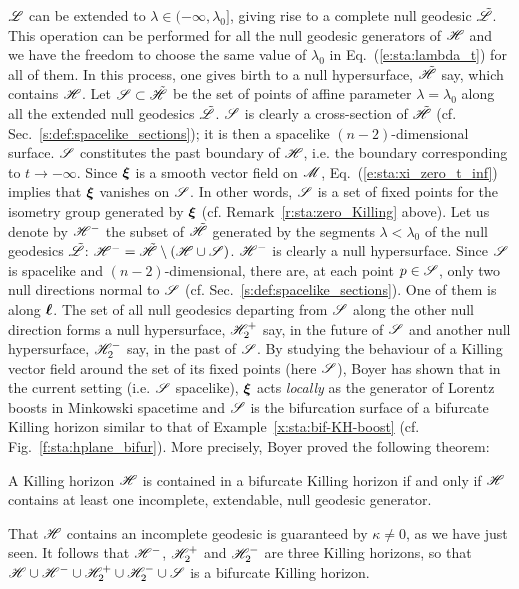 $\mathscr{L}$ can be
extended to $\lambda\in(-\infty,\lambda_0]$, giving rise to a complete
null geodesic $\tilde{\mathscr{L}}$. This operation can be performed for all the
null geodesic generators of $\mathscr{H}$ and we have the freedom to choose the same value
of $\lambda_0$ in Eq.~(\ref{e:sta:lambda_t}) for all of them. In this process,
one gives birth to a null hypersurface, $\tilde{\mathscr{H}}$ say, which contains $\mathscr{H}$. Let $\mathscr{S}\subset\tilde{\mathscr{H}}$ be the set of points of
affine parameter $\lambda=\lambda_0$ along all the extended null geodesics
$\tilde{\mathscr{L}}$. $\mathscr{S}$ is clearly a cross-section of $\tilde{\mathscr{H}}$
(cf. Sec.~\ref{s:def:spacelike_sections}); it is then a
spacelike $(n-2)$-dimensional surface.
$\mathscr{S}$ constitutes the past boundary of $\mathscr{H}$, i.e. the boundary corresponding to $t\rightarrow -\infty$.
Since $\bm{\xi}$ is a smooth vector field on $\mathscr{M}$, Eq.~(\ref{e:sta:xi_zero_t_inf})
implies that $\bm{\xi}$ vanishes on $\mathscr{S}$.
In other words, $\mathscr{S}$ is a set of fixed points for the isometry group generated
by $\bm{\xi}$ (cf. Remark~\ref{r:sta:zero_Killing} above).
Let us denote by $\mathscr{H}^-$ the subset of $\tilde{\mathscr{H}}$
generated by the segments $\lambda<\lambda_0$ of the null geodesics $\tilde{\mathscr{L}}$:
$\mathscr{H}^- = \tilde{\mathscr{H}}\setminus(\mathscr{H}\cup\mathscr{S})$.
$\mathscr{H}^-$ is clearly a null hypersurface.
Since $\mathscr{S}$ is spacelike and $(n-2)$-dimensional, there are, at each point
$p\in\mathscr{S}$, only two null directions normal to $\mathscr{S}$ (cf. Sec.~\ref{s:def:spacelike_sections}). One of them is along $\bm{\ell}$. The set of all null geodesics
departing from $\mathscr{S}$ along the other null direction forms a null hypersurface,
$\mathscr{H}_2^+$ say, in the future of $\mathscr{S}$ and another null hypersurface, $\mathscr{H}_2^-$
say, in the past of $\mathscr{S}$.
By studying the behaviour of a Killing vector field around the set of its
fixed points (here $\mathscr{S}$), Boyer \cite{Boyer69} has shown that in
the current setting (i.e. $\mathscr{S}$ spacelike), $\bm{\xi}$ acts \emph{locally}
as the generator of Lorentz boosts in Minkowski spacetime and $\mathscr{S}$ is the bifurcation surface
of a bifurcate Killing horizon similar to that of Example~\ref{x:sta:bif-KH-boost}
(cf. Fig.~\ref{f:sta:hplane_bifur}).
More precisely, Boyer proved the following theorem:

\begin{prop}
A Killing horizon $\mathscr{H}$ is contained in a bifurcate Killing horizon if and
only if $\mathscr{H}$ contains at least one incomplete, extendable, null geodesic
generator.
\end{prop}

That $\mathscr{H}$ contains an incomplete geodesic is guaranteed by
$\kappa\not=0$, as we have just seen.
It follows that $\mathscr{H}^-$, $\mathscr{H}_2^+$ and $\mathscr{H}_2^-$
are three Killing horizons, so that $\mathscr{H}\cup\mathscr{H}^-\cup\mathscr{H}_2^+\cup\mathscr{H}_2^-\cup\mathscr{S}$
is a bifurcate Killing horizon.

